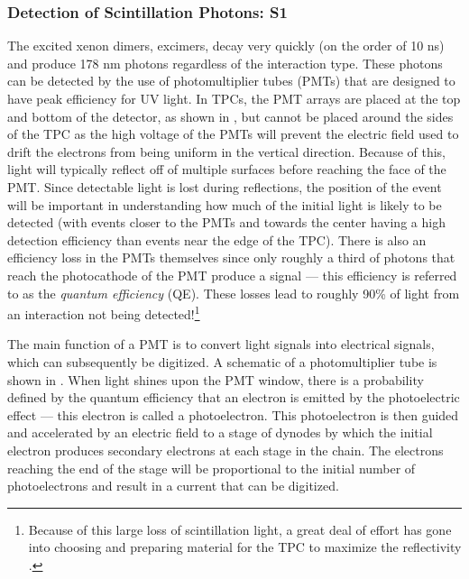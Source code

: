 \subsubsection{Detection of Scintillation Photons: S1}

The excited xenon dimers, excimers, decay very quickly (on the order of 10 ns) and produce 178 nm photons regardless of the interaction type.  These photons can be detected by the use of photomultiplier tubes (PMTs) that are designed to have peak efficiency for UV light.  In TPCs, the PMT arrays are placed at the top and bottom of the detector, as shown in , but cannot be placed around the sides of the TPC as the high voltage of the PMTs will prevent the electric field used to drift the electrons from being uniform in the vertical direction.  Because of this, light will typically reflect off of multiple surfaces before reaching the face of the PMT.  Since detectable light is lost during reflections, the position of the event will be important in understanding how much of the initial light is likely to be detected (with events closer to the PMTs and towards the center having a high detection efficiency than events near the edge of the TPC).  There is also an efficiency loss in the PMTs themselves since only roughly a third of photons that reach the photocathode of the PMT produce a signal --- this efficiency is referred to as the \textit{quantum efficiency} (QE).  These losses lead to roughly 90\% of light from an interaction not being detected!\footnote{Because of this large loss of scintillation light, a great deal of effort has gone into choosing and preparing material for the TPC to maximize the reflectivity \cite{silva2009reflectance, haefner2017reflectance, neves2017measurement}.}  

The main function of a PMT is to convert light signals into electrical signals, which can subsequently be digitized.  A schematic of a photomultiplier tube is shown in .  When light shines upon the PMT window, there is a probability defined by the quantum efficiency that an electron is emitted by the photoelectric effect --- this electron is called a photoelectron.  This photoelectron is then guided and accelerated by an electric field to a stage of dynodes by which the initial electron produces secondary electrons at each stage in the chain.  The electrons reaching the end of the stage will be proportional to the initial number of photoelectrons and result in a current that can be digitized.  

